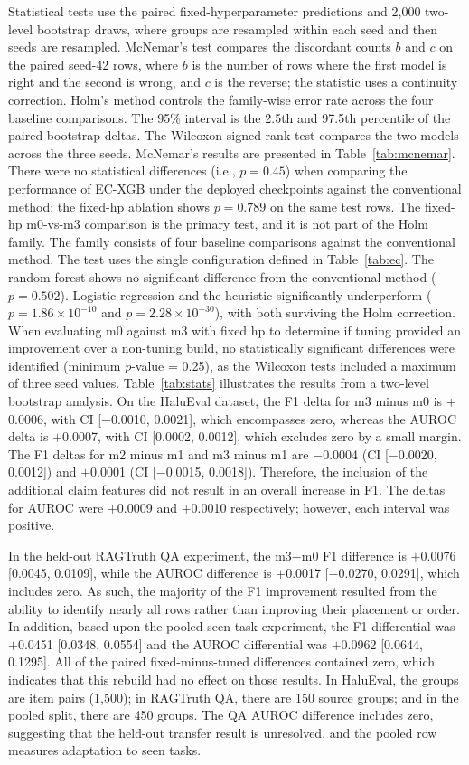 \documentclass[a4paper,fleqn]{cas-sc}
\begin{document}
Statistical tests use the paired fixed-hyperparameter predictions and 2{,}000 two-level bootstrap draws, where groups are resampled within each seed and then seeds are resampled. McNemar's test compares the discordant counts $b$ and $c$ on the paired seed-42 rows, where $b$ is the number of rows where the first model is right and the second is wrong, and $c$ is the reverse; the statistic uses a continuity correction. Holm's method controls the family-wise error rate across the four baseline comparisons. The 95\% interval is the 2.5th and 97.5th percentile of the paired bootstrap deltas. The Wilcoxon signed-rank test compares the two models across the three seeds. McNemar's results are presented in Table~\ref{tab:mcnemar}. There were no statistical differences (i.e., $p = 0.45$) when comparing the performance of EC-XGB under the deployed checkpoints against the conventional method; the fixed-hp ablation shows $p = 0.789$ on the same test rows. The fixed-hp m0-vs-m3 comparison is the primary test, and it is not part of the Holm family. The family consists of four baseline comparisons against the conventional method. The test uses the single configuration defined in Table~\ref{tab:ec}. The random forest shows no significant difference from the conventional method ($p = 0.502$). Logistic regression and the heuristic significantly underperform ($p = 1.86\times10^{-10}$ and $p = 2.28\times10^{-30}$), with both surviving the Holm correction. When evaluating m0 against m3 with fixed hp to determine if tuning provided an improvement over a non-tuning build, no statistically significant differences were identified (minimum $p$-value = 0.25), as the Wilcoxon tests included a maximum of three seed values. Table~\ref{tab:stats} illustrates the results from a two-level bootstrap analysis. On the HaluEval dataset, the F1 delta for m3 minus m0 is $+$0.0006, with CI [$-$0.0010, 0.0021], which encompasses zero, whereas the AUROC delta is $+$0.0007, with CI [0.0002, 0.0012], which excludes zero by a small margin. The F1 deltas for m2 minus m1 and m3 minus m1 are $-$0.0004 (CI [$-$0.0020, 0.0012]) and $+$0.0001 (CI [$-$0.0015, 0.0018]). Therefore, the inclusion of the additional claim features did not result in an overall increase in F1. The deltas for AUROC were $+$0.0009 and $+$0.0010 respectively; however, each interval was positive.

In the held-out RAGTruth QA experiment, the m3$-$m0 F1 difference is $+$0.0076 [0.0045, 0.0109], while the AUROC difference is $+$0.0017 [$-$0.0270, 0.0291], which includes zero. As such, the majority of the F1 improvement resulted from the ability to identify nearly all rows rather than improving their placement or order. In addition, based upon the pooled seen task experiment, the F1 differential was $+$0.0451 [0.0348, 0.0554] and the AUROC differential was $+$0.0962 [0.0644, 0.1295]. All of the paired fixed-minus-tuned differences contained zero, which indicates that this rebuild had no effect on those results. In HaluEval, the groups are item pairs (1{,}500); in RAGTruth QA, there are 150 source groups; and in the pooled split, there are 450 groups. The QA AUROC difference includes zero, suggesting that the held-out transfer result is unresolved, and the pooled row measures adaptation to seen tasks.
\end{document}
